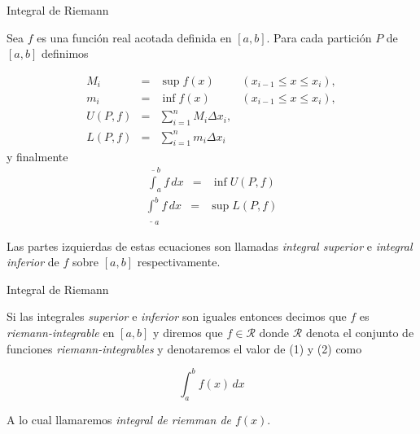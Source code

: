 \documentclass[10pt]{beamer}
\begin{document}
\begin{frame}{Integral de Riemann}

\begin{definition}[2]
Sea $f$ es una función real acotada definida en $[a, b]$. Para cada partición $P$ de $[a, b]$ definimos

\begin{equation*}
	\begin{array}{rcll}
		M_i & = & \sup f(x) & (x_{i-1} \leq x \leq x_i), \\
		m_i & = & \inf f(x) & (x_{i-1} \leq x \leq x_i), \\
		U(P, f) & = & \sum_{i=1}^n M_i \Delta x_i , \\
		L(P, f) & = & \sum_{i=1}^n m_i \Delta x_i
	\end{array}
\end{equation*}
y finalmente
\begin{equation}
	\begin{array}{rcl}
		\overline{\int}_a^b f\,dx & = & \inf U(P, f)
	\end{array}
\end{equation}
\begin{equation}
	\begin{array}{rcl}
		\underline{\int}_a^b f\,dx & = & \sup L(P, f)
	\end{array}
\end{equation}

Las partes izquierdas de estas ecuaciones son llamadas \textit{integral superior} e \textit{integral inferior} de $f$ sobre $[a, b]$ respectivamente.
\end{definition}

\end{frame}

\begin{frame}{Integral de Riemann}

\begin{definition}[3]
Si las integrales \textit{superior} e \textit{inferior} son iguales entonces decimos que $f$ es \textit{riemann-integrable} en $[a, b]$ y diremos que $f\in \mathcal{R}$ donde $\mathcal{R}$ denota el conjunto de funciones \textit{riemann-integrables} y denotaremos el valor de (1) y (2) como

\begin{equation}
	\int_a^b f(x)\,dx
\end{equation}

A lo cual llamaremos \textit{integral de riemman de $f(x)$}.
\end{definition}

\end{frame}
\end{document}
